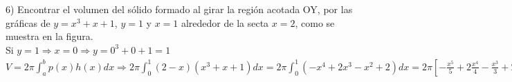 \documentclass[12pt]{report}
\newcommand{\unit}[1]{\ensuremath{\, \mathrm{#1}}}
\begin{document}
    6) Encontrar el volumen del sólido formado al girar la región acotada OY, por las gráficas de $y = x^3+x+1$, $y=1$ y $x=1$ alrededor de la secta $x=2$, como se muestra en la figura. \\
    Si $y=1 \Rightarrow x = 0 \Rightarrow y=0^3+0+1=1$ \\
    $V = 2\pi\int_a^bp(x)h(x)dx \Rightarrow 2\pi\int_0^1(2-x)(x^3+x+1)dx = 2\pi\int_0^1(-x^4+2x^3-x^2+2)dx = 2\pi[-\frac{x^5}{5} + 2\frac{x^4}{4} - \frac{x^3}{3} + 2x]_0^1 = 2\pi[(-\frac{1^5}{5} + 2\frac{1^4}{4} - \frac{1^3}{3} + 2(1))-0] = 2\pi[-\frac{1}{5} + 2\frac{1}{4} - \frac{1}{3} + 2] = 2\pi(-\frac{1}{5} - \frac{1}{3} + 3) = 2\pi(\frac{-3-5+45}{3\cdot 5}) = 2\pi(\frac{13}{15}) = \boxed{\frac{74\pi}{15} \unit{u^3}} $
\end{document}

